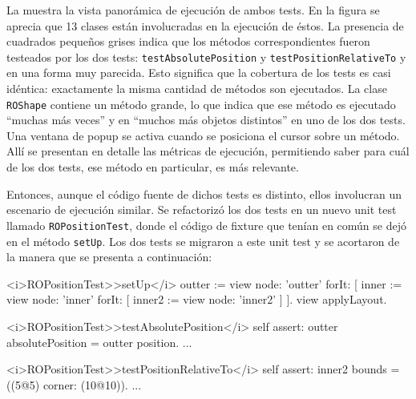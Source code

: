 \vspace*{0.3cm}


\par La  muestra la vista panorámica de ejecución de ambos tests. En la figura se aprecia que 13 clases están involucradas en la ejecución de éstos. La presencia de cuadrados pequeños grises indica que los métodos correspondientes fueron testeados por los dos tests: {\tt testAbsolutePosition} y {\tt testPositionRelativeTo} y en una forma muy parecida. Esto significa que la cobertura de los tests es casi idéntica: exactamente la misma cantidad de métodos son ejecutados. La clase {\tt ROShape} contiene un método grande, lo que indica que ese método es ejecutado  ``muchas más veces'' y en ``muchos más objetos distintos'' en uno de los dos tests. Una ventana de popup se activa cuando se posiciona el cursor sobre un método. Allí se presentan en detalle las métricas de ejecución, permitiendo saber para cuál de los dos tests, ese método en particular, es más relevante.


\par Entonces, aunque el código fuente de dichos tests es distinto, ellos involucran un escenario de ejecución similar. Se refactorizó los dos tests en un nuevo unit test llamado {\tt ROPositionTest}, donde el código de fixture que tenían en común se dejó en el método {\tt setUp}. Los dos tests se migraron a este unit test y se acortaron de la manera que se presenta a continuación:


\begin{codeWithLineNumbers}
<i>ROPositionTest>>setUp</i>
	outter := view node: 'outter' forIt: [
		inner := view node: 'inner' forIt: [
			inner2 := view node: 'inner2'
		]
	].
	view applyLayout.	
	
<i>ROPositionTest>>testAbsolutePosition</i>
	self assert: outter absolutePosition = outter position.
	...
		
<i>ROPositionTest>>testPositionRelativeTo</i>
	self assert: inner2 bounds = ((5@5) corner: (10@10)).
	...
\end{codeWithLineNumbers}


